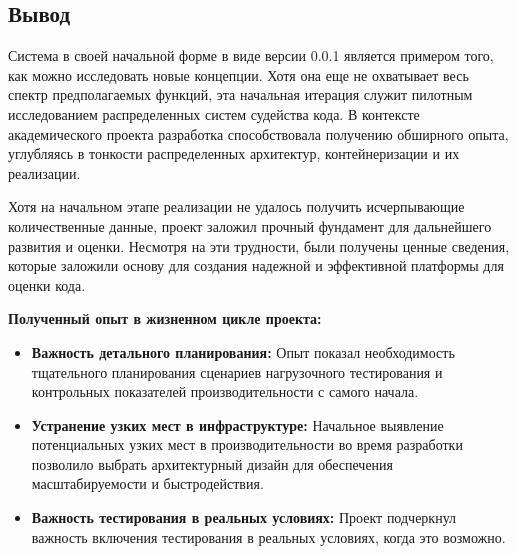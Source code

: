 \subsection{Вывод}
Система в своей начальной форме в виде версии 0.0.1 является примером того, как можно исследовать новые концепции. 
Хотя она еще не охватывает весь спектр предполагаемых функций, эта начальная итерация служит пилотным исследованием распределенных систем судейства кода.
В контексте академического проекта разработка способствовала получению обширного опыта, углубляясь в тонкости распределенных архитектур, контейнеризации и их реализации. \newline

\noindent
Хотя на начальном этапе реализации не удалось получить исчерпывающие количественные данные, проект заложил прочный фундамент для дальнейшего развития и оценки.
Несмотря на эти трудности, были получены ценные сведения, которые заложили основу для создания надежной и эффективной платформы для оценки кода.

\noindent
\textbf{Полученный опыт в жизненном цикле проекта:}
\begin{itemize}
    \item \textbf{Важность детального планирования:} Опыт показал необходимость тщательного планирования сценариев нагрузочного тестирования и контрольных показателей производительности с самого начала.
    \item \textbf{Устранение узких мест в инфраструктуре:} Начальное выявление потенциальных узких мест в производительности во время разработки позволило выбрать архитектурный дизайн для обеспечения масштабируемости и быстродействия.
    \item \textbf{Важность тестирования в реальных условиях:} Проект подчеркнул важность включения тестирования в реальных условиях, когда это возможно.
\end{itemize}
